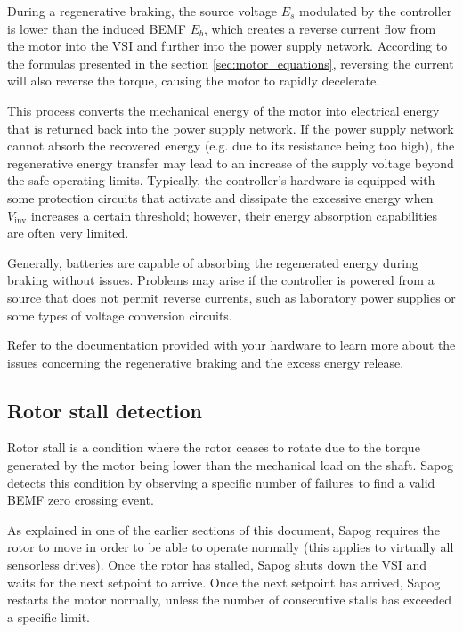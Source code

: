 \documentclass{zubaxdoc}
\begin{document}
During a regenerative braking, the source voltage $E_s$ modulated by the controller is lower than the
induced BEMF $E_b$, which creates a reverse current flow from the motor into the VSI
and further into the power supply network.
According to the formulas presented in the section \ref{sec:motor_equations},
reversing the current will also reverse the torque, causing the motor to rapidly decelerate.

This process converts the mechanical energy of the motor into electrical energy that is returned back into the
power supply network.
If the power supply network cannot absorb the recovered energy (e.g. due to its resistance being too high),
the regenerative energy transfer may lead to an increase of the supply voltage beyond the safe operating limits.
Typically, the controller's hardware is equipped with some protection circuits that activate and dissipate the
excessive energy when $V_\text{inv}$ increases a certain threshold;
however, their energy absorption capabilities are often very limited.

Generally, batteries are capable of absorbing the regenerated energy during braking without issues.
Problems may arise if the controller is powered from a source that does not permit reverse currents,
such as laboratory power supplies or some types of voltage conversion circuits.

Refer to the documentation provided with your hardware to learn more about the issues
concerning the regenerative braking and the excess energy release.

\subsection{Rotor stall detection}\label{sec:stall_detection}

Rotor stall is a condition where the rotor ceases to rotate due to the torque generated by the motor
being lower than the mechanical load on the shaft.
Sapog detects this condition by observing a specific number of failures to find
a valid BEMF zero crossing event.

As explained in one of the earlier sections of this document,
Sapog requires the rotor to move in order to be able to operate normally
(this applies to virtually all sensorless drives).
Once the rotor has stalled, Sapog shuts down the VSI and waits for the next setpoint to arrive.
Once the next setpoint has arrived, Sapog restarts the motor normally,
unless the number of consecutive stalls has exceeded a specific limit.
\end{document}
